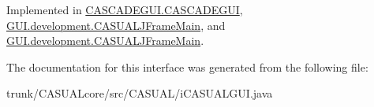 Implemented in \hyperlink{classCASCADEGUI_1_1CASCADEGUI_a0b56a081d828cd896d81278086a55871}{C\-A\-S\-C\-A\-D\-E\-G\-U\-I.\-C\-A\-S\-C\-A\-D\-E\-G\-U\-I}, \hyperlink{classGUI_1_1development_1_1CASUALJFrameMain_a019f07e0dcd01688f121d01a6a4f08fb}{G\-U\-I.\-development.\-C\-A\-S\-U\-A\-L\-J\-Frame\-Main}, and \hyperlink{classGUI_1_1development_1_1CASUALJFrameMain_a019f07e0dcd01688f121d01a6a4f08fb}{G\-U\-I.\-development.\-C\-A\-S\-U\-A\-L\-J\-Frame\-Main}.



The documentation for this interface was generated from the following file\-:\begin{DoxyCompactItemize}
\item 
trunk/\-C\-A\-S\-U\-A\-Lcore/src/\-C\-A\-S\-U\-A\-L/i\-C\-A\-S\-U\-A\-L\-G\-U\-I.\-java\end{DoxyCompactItemize}

